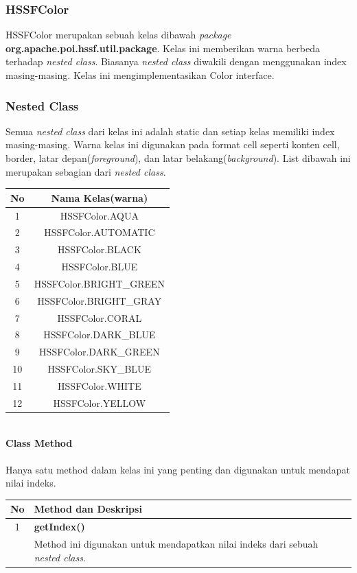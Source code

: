 \subsubsection{HSSFColor}
HSSFColor merupakan sebuah kelas dibawah \textit{package} \textbf{org.apache.poi.hssf.util.package}. Kelas ini memberikan warna berbeda terhadap \textit{nested class}. Biasanya \textit{nested class} diwakili dengan menggunakan index masing-masing. Kelas ini mengimplementasikan Color interface.\cite{tutpoint}

	
\subsubsection{Nested Class}
Semua \textit{nested class} dari kelas ini adalah static dan setiap kelas memiliki index masing-masing. Warna kelas ini digunakan pada format cell seperti konten cell, border, latar depan(\textit{foreground}), dan latar belakang(\textit{background}). List dibawah ini merupakan sebagian dari \textit{nested class}.\cite{tutpoint}

\begin{tabular}{|c|c|}
		\hline
		\textbf{No} & \textbf{Nama Kelas(warna)} \\ \hline \hline
		1 & HSSFColor.AQUA\\ \hline 
		2 &	HSSFColor.AUTOMATIC\\ \hline 
		3 & HSSFColor.BLACK \\ \hline
		4	&	HSSFColor.BLUE\\ \hline
		5	&	HSSFColor.BRIGHT\_GREEN\\ \hline
		6 &	HSSFColor.BRIGHT\_GRAY\\ \hline
		7 &	HSSFColor.CORAL \\ \hline
		8 &	HSSFColor.DARK\_BLUE\\ \hline
		9 &	HSSFColor.DARK\_GREEN\\ \hline
		10 &	HSSFColor.SKY\_BLUE\\ \hline
		11 &	HSSFColor.WHITE\\ \hline
		12 &	HSSFColor.YELLOW\\ \hline
	\end{tabular}
	\\
	\noindent \textbf{Class Method}\\ \\
	Hanya satu method dalam kelas ini yang penting dan digunakan untuk mendapat nilai indeks.\\
	\begin{tabular}{|c|p{12cm}|}
		\hline
		\textbf{No} & \textbf{Method dan Deskripsi} \\ \hline \hline
		1 & \textbf{getIndex()}\\
			&	Method ini digunakan untuk mendapatkan nilai indeks dari sebuah \textit{nested class}.\\ \hline 
	\end{tabular}
	

